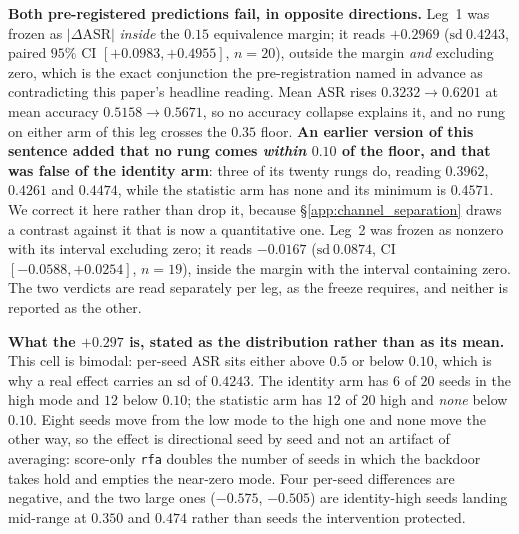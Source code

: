 \documentclass{article}
\begin{document}
\textbf{Both pre-registered predictions fail, in opposite directions.} Leg~1 was frozen as $|\Delta\mathrm{ASR}|$ \emph{inside} the $0.15$ equivalence margin; it reads $\mathbf{+0.2969}$ ($\mathrm{sd}\ 0.4243$, paired $95\%$ CI $[+0.0983, +0.4955]$, $n{=}20$), outside the margin \emph{and} excluding zero, which is the exact conjunction the pre-registration named in advance as contradicting this paper's headline reading. Mean ASR rises $0.3232 \to 0.6201$ at mean accuracy $0.5158 \to 0.5671$, so no accuracy collapse explains it, and no rung on either arm of this leg crosses the $0.35$ floor. \textbf{An earlier version of this sentence added that no rung comes \emph{within} $0.10$ of the floor, and that was false of the identity arm}: three of its twenty rungs do, reading $0.3962$, $0.4261$ and $0.4474$, while the statistic arm has none and its minimum is $0.4571$. We correct it here rather than drop it, because §\ref{app:channel_separation} draws a contrast against it that is now a quantitative one. Leg~2 was frozen as nonzero with its interval excluding zero; it reads $-0.0167$ ($\mathrm{sd}\ 0.0874$, CI $[-0.0588, +0.0254]$, $n{=}19$), inside the margin with the interval containing zero. The two verdicts are read separately per leg, as the freeze requires, and neither is reported as the other.

\textbf{What the $+0.297$ is, stated as the distribution rather than as its mean.} This cell is bimodal: per-seed ASR sits either above $0.5$ or below $0.10$, which is why a real effect carries an $\mathrm{sd}$ of $0.4243$. The identity arm has $6$ of $20$ seeds in the high mode and $12$ below $0.10$; the statistic arm has $12$ of $20$ high and \emph{none} below $0.10$. Eight seeds move from the low mode to the high one and none move the other way, so the effect is directional seed by seed and not an artifact of averaging: score-only \texttt{rfa} doubles the number of seeds in which the backdoor takes hold and empties the near-zero mode. Four per-seed differences are negative, and the two large ones ($-0.575$, $-0.505$) are identity-high seeds landing mid-range at $0.350$ and $0.474$ rather than seeds the intervention protected.
\end{document}

